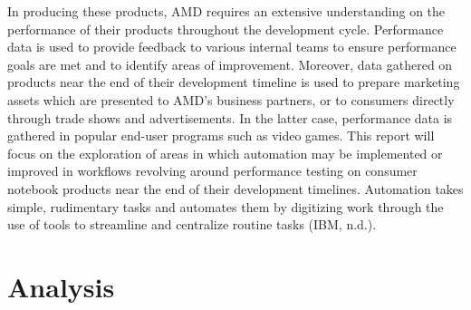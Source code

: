 \documentclass[12pt]{article}
\begin{document}
In producing these products, AMD requires an extensive understanding on the performance of their products throughout the development cycle. Performance data is used to provide feedback to various internal teams to ensure performance goals are met and to identify areas of improvement. Moreover, data gathered on products near the end of their development timeline is used to prepare marketing assets which are presented to AMD’s business partners, or to consumers directly through trade shows and advertisements. In the latter case, performance data is gathered in popular end-user programs such as video games. 
This report will focus on the exploration of areas in which automation may be implemented or improved in workflows revolving around performance testing on consumer notebook products near the end of their development timelines. Automation takes simple, rudimentary tasks and automates them by digitizing work through the use of tools to streamline and centralize routine tasks (IBM, n.d.).



\newpage
\section{Analysis} 

\end{document}
